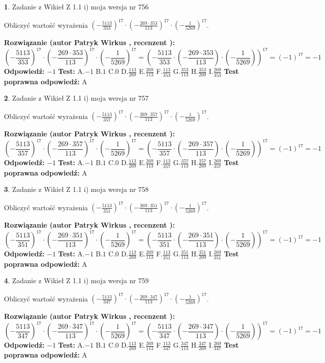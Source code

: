 \documentclass[12pt, a4paper]{article}
\theoremstyle{definition} %
\newtheorem{zad}{}
\newcommand{\zadStart}[1]{\begin{zad}#1\newline}
\newcommand{\zadStop}{\end{zad}}
\newcommand{\rozwStart}[2]{\noindent \textbf{Rozwiązanie (autor #1 , recenzent #2): }\newline}
\newcommand{\rozwStop}{\newline}
\newcommand{\odpStart}{\noindent \textbf{Odpowiedź:}\newline}
\newcommand{\odpStop}{\newline}
\newcommand{\testStart}{\noindent \textbf{Test:}\newline}
\newcommand{\testStop}{\newline}
\newcommand{\kluczStart}{\noindent \textbf{Test poprawna odpowiedź:}\newline}
\newcommand{\kluczStop}{\newline}
\begin{document}
\zadStart{Zadanie z Wikieł Z 1.1 i) moja wersja nr 756}

Obliczyć wartość wyrażenia $(-\frac{5113}{353})^{17} \cdot (-\frac{269 \cdot 353}{113})^{17} \cdot (-\frac{1}{5269})^{17}$.
\zadStop
\rozwStart{Patryk Wirkus}{}
$$(-\frac{5113}{353})^{17} \cdot (-\frac{269 \cdot 353}{113})^{17} \cdot (-\frac{1}{5269})^{17} = (-\frac{5113}{353} \cdot (-\frac{269 \cdot 353}{113}) \cdot (-\frac{1}{5269}))^{17} = (-1)^{17} = -1$$
\rozwStop
\odpStart
$-1$
\odpStop
\testStart
A.$-1$ B.$1$ C.$0$ D.$\frac{113}{269}$ E.$\frac{269}{113}$
F.$\frac{113}{353}$ G.$\frac{353}{113}$
H.$\frac{353}{269}$
I.$\frac{269}{353}$
\testStop
\kluczStart
A
\kluczStop



\zadStart{Zadanie z Wikieł Z 1.1 i) moja wersja nr 757}

Obliczyć wartość wyrażenia $(-\frac{5113}{357})^{17} \cdot (-\frac{269 \cdot 357}{113})^{17} \cdot (-\frac{1}{5269})^{17}$.
\zadStop
\rozwStart{Patryk Wirkus}{}
$$(-\frac{5113}{357})^{17} \cdot (-\frac{269 \cdot 357}{113})^{17} \cdot (-\frac{1}{5269})^{17} = (-\frac{5113}{357} \cdot (-\frac{269 \cdot 357}{113}) \cdot (-\frac{1}{5269}))^{17} = (-1)^{17} = -1$$
\rozwStop
\odpStart
$-1$
\odpStop
\testStart
A.$-1$ B.$1$ C.$0$ D.$\frac{113}{269}$ E.$\frac{269}{113}$
F.$\frac{113}{357}$ G.$\frac{357}{113}$
H.$\frac{357}{269}$
I.$\frac{269}{357}$
\testStop
\kluczStart
A
\kluczStop



\zadStart{Zadanie z Wikieł Z 1.1 i) moja wersja nr 758}

Obliczyć wartość wyrażenia $(-\frac{5113}{351})^{17} \cdot (-\frac{269 \cdot 351}{113})^{17} \cdot (-\frac{1}{5269})^{17}$.
\zadStop
\rozwStart{Patryk Wirkus}{}
$$(-\frac{5113}{351})^{17} \cdot (-\frac{269 \cdot 351}{113})^{17} \cdot (-\frac{1}{5269})^{17} = (-\frac{5113}{351} \cdot (-\frac{269 \cdot 351}{113}) \cdot (-\frac{1}{5269}))^{17} = (-1)^{17} = -1$$
\rozwStop
\odpStart
$-1$
\odpStop
\testStart
A.$-1$ B.$1$ C.$0$ D.$\frac{113}{269}$ E.$\frac{269}{113}$
F.$\frac{113}{351}$ G.$\frac{351}{113}$
H.$\frac{351}{269}$
I.$\frac{269}{351}$
\testStop
\kluczStart
A
\kluczStop



\zadStart{Zadanie z Wikieł Z 1.1 i) moja wersja nr 759}

Obliczyć wartość wyrażenia $(-\frac{5113}{347})^{17} \cdot (-\frac{269 \cdot 347}{113})^{17} \cdot (-\frac{1}{5269})^{17}$.
\zadStop
\rozwStart{Patryk Wirkus}{}
$$(-\frac{5113}{347})^{17} \cdot (-\frac{269 \cdot 347}{113})^{17} \cdot (-\frac{1}{5269})^{17} = (-\frac{5113}{347} \cdot (-\frac{269 \cdot 347}{113}) \cdot (-\frac{1}{5269}))^{17} = (-1)^{17} = -1$$
\rozwStop
\odpStart
$-1$
\odpStop
\testStart
A.$-1$ B.$1$ C.$0$ D.$\frac{113}{269}$ E.$\frac{269}{113}$
F.$\frac{113}{347}$ G.$\frac{347}{113}$
H.$\frac{347}{269}$
I.$\frac{269}{347}$
\testStop
\kluczStart
A
\kluczStop
\end{document}
